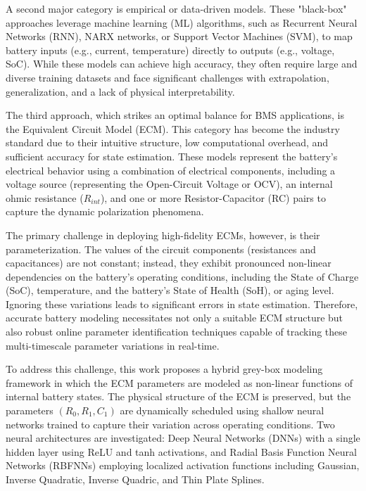 \documentclass[lettersize,journal]{IEEEtran}
\begin{document}
A second major category is empirical or data-driven models. These "black-box" approaches leverage machine learning (ML) algorithms, such as Recurrent Neural Networks (RNN), NARX networks, or Support Vector Machines (SVM), to map battery inputs (e.g., current, temperature) directly to outputs (e.g., voltage, SoC)\cite{kawahara2023battery, wang2021coestimation, xia2024hybrid}. While these models can achieve high accuracy, they often require large and diverse training datasets and face significant challenges with extrapolation, generalization, and a lack of physical interpretability\cite{valizadeh2024machine, kawahara2023battery}.

The third approach, which strikes an optimal balance for BMS applications, is the Equivalent Circuit Model (ECM). This category has become the industry standard due to their intuitive structure, low computational overhead, and sufficient accuracy for state estimation\cite{tekin2024comparative}. These models represent the battery's electrical behavior using a combination of electrical components, including a voltage source (representing the Open-Circuit Voltage or OCV), an internal ohmic resistance ($R_{int}$), and one or more Resistor-Capacitor (RC) pairs to capture the dynamic polarization phenomena\cite{khalfi2021electric}.

The primary challenge in deploying high-fidelity ECMs, however, is their parameterization. The values of the circuit components (resistances and capacitances) are not constant; instead, they exhibit pronounced non-linear dependencies on the battery's operating conditions, including the State of Charge (SoC), temperature, and the battery's State of Health (SoH), or aging level\cite{tran2021comprehensive}. Ignoring these variations leads to significant errors in state estimation. Therefore, accurate battery modeling necessitates not only a suitable ECM structure but also robust online parameter identification techniques capable of tracking these multi-timescale parameter variations in real-time\cite{pai2023online, yang2023improved, beelen2018experiment}.

To address this challenge, this work proposes a hybrid grey-box modeling framework in which the ECM parameters are modeled as non-linear functions of internal battery states. The physical structure of the ECM is preserved, but the parameters $( R_0, R_1, C_1 )$ are dynamically scheduled using shallow neural networks trained to capture their variation across operating conditions. Two neural architectures are investigated: Deep Neural Networks (DNNs) with a single hidden layer using ReLU and tanh activations, and Radial Basis Function Neural Networks (RBFNNs) employing localized activation functions including Gaussian, Inverse Quadratic, Inverse Quadric, and Thin Plate Splines.
\end{document}
